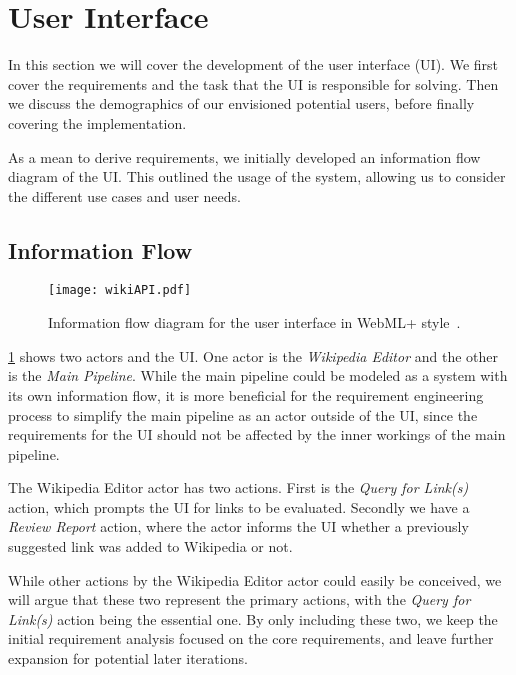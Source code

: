 \section{User Interface}\label{sec:design_ui}

In this section we will cover the development of the user interface (UI). We first cover the requirements and the task that the UI is responsible for solving. Then we discuss the demographics of our envisioned potential users, before finally covering the implementation.

As a mean to derive requirements, we initially developed an information flow diagram of the UI\@. This outlined the usage of the system, allowing us to consider the different use cases and user needs.

\subsection{Information Flow}

\begin{figure}[tbp]
\centering
\texttt{[image: wikiAPI.pdf]}
\caption[Information flow diagram for the user interface]{Information flow diagram for the user interface in WebML+ style~\cite{Casteleyn2009}.}
\label{fig:information_flow_UI}
\end{figure}

\cref{fig:information_flow_UI} shows two actors and the UI\@{}. One actor is the \emph{Wikipedia Editor} and the other is the \emph{Main Pipeline}. While the main pipeline could be modeled as a system with its own information flow, it is more beneficial for the requirement engineering process to simplify the main pipeline as an actor outside of the UI, since the requirements for the UI should not be affected by the inner workings of the main pipeline.

The Wikipedia Editor actor has two actions. First is the \emph{Query for Link(s)} action, which prompts the UI for links to be evaluated. Secondly we have a \emph{Review Report} action, where the actor informs the UI whether a previously suggested link was added to Wikipedia or not.

While other actions by the Wikipedia Editor actor could easily be conceived, we will argue that these two represent the primary actions, with the \emph{Query for Link(s)} action being the essential one. By only including these two, we keep the initial requirement analysis focused on the core requirements, and leave further expansion for potential later iterations.

